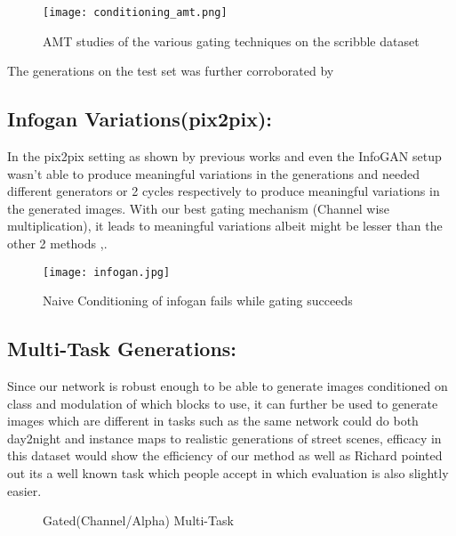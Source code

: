 \begin{figure}
    \centering
    \texttt{[image: conditioning\_amt.png]}
    \caption{AMT studies of the various gating techniques on the scribble dataset}\label{fig:conditioning_amt}
    \vspace{-4mm}
\end{figure}

The generations on the test set was further corroborated by 

\subsection{Infogan Variations(pix2pix):}
In the pix2pix setting as shown by previous works \cite{ghosh2017multi} and \cite{zhu2017toward} even the InfoGAN setup wasn't able to produce meaningful variations in the generations and needed different generators or 2 cycles respectively to produce meaningful variations in the generated images. With our best gating mechanism (Channel wise multiplication), it leads to meaningful variations albeit might be lesser than the other 2 methods \cite{ghosh2017multi} ,\cite{zhu2017toward}.

\begin{figure}
    \centering
    \texttt{[image: infogan.jpg]}
    \caption{Naive Conditioning of infogan fails while gating succeeds}\label{fig:infogan_gate}
    \vspace{-4mm}
\end{figure}

\subsection{Multi-Task Generations: }
Since our network is robust enough to be able to generate images conditioned on class and modulation of which blocks to use, it can further be used to generate images which are different in tasks such as the same network could do both day2night and instance maps to realistic generations of street scenes, efficacy in this dataset would show the efficiency of our method as well as Richard pointed out its a well known task which people accept in which evaluation is also slightly easier.


\begin{figure*}%
    \centering
    \caption{Gated(Channel/Alpha) Multi-Task}
    \label{fig:channel_gated_multi-task}
    \vspace{-3mm}
\end{figure*}

